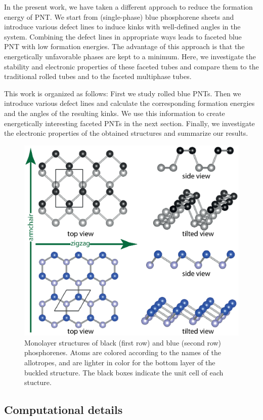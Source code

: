 In the present work, we have taken a different approach to reduce the formation energy of PNT. We start from (single-phase) blue phosphorene sheets and introduce various defect lines to induce kinks with well-defined angles in the system. Combining the defect lines in appropriate ways leads to faceted blue PNT with low formation energies. The advantage of this approach is that the energetically unfavorable phases are kept to a minimum. Here, we investigate the stability and electronic properties of these faceted tubes and compare them to the traditional rolled tubes and to the faceted multiphase tubes. 

This work is organized as follows: First we study rolled blue PNTs. Then we introduce various defect lines and calculate the corresponding formation energies and the angles of the resulting kinks. We use this information to create energetically interesting faceted PNTs in the next section. Finally, we investigate the electronic properties of the obtained structures and summarize our results.


\begin{figure}[htbp]
\centering
\includegraphics[width=0.7\linewidth]{Nanotu_monolayer_structures.eps}%
\caption{Monolayer structures of black (first row) and blue (second row) phosphorenes. Atoms are colored according to the names of the allotropes, and are lighter in color for the bottom layer of the buckled structure. The black boxes indicate the unit cell of each stucture. \label{natu_monolayer}}
\end{figure}

\subsection{Computational details}

